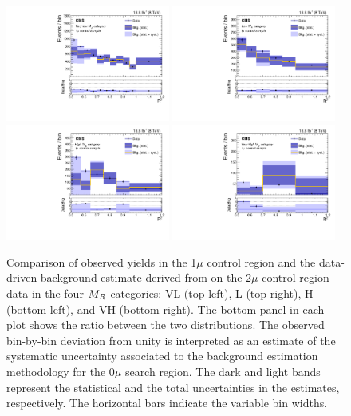 \begin{figure}
 \centering
   \includegraphics[width=0.48\textwidth]{PredPlotsAN_1MU_LE/OneMu_sys_cat_1.pdf}
   \includegraphics[width=0.48\textwidth]{PredPlotsAN_1MU_LE/OneMu_sys_cat_2.pdf}
   \includegraphics[width=0.48\textwidth]{PredPlotsAN_1MU_LE/OneMu_sys_cat_3.pdf}
   \includegraphics[width=0.48\textwidth]{PredPlotsAN_1MU_LE/OneMu_sys_cat_4.pdf}
 \caption{Comparison of observed yields in the 1$\mu$ control region and the
   data-driven background estimate derived from on the 2$\mu$ control region data in the four $M_R$ categories:
   VL (top left), L (top right), H (bottom left), and VH (bottom right). The bottom panel in each plot shows the
   ratio between the two distributions. The observed bin-by-bin
   deviation from unity is interpreted as an estimate of the systematic uncertainty
   associated to the background estimation methodology for the 0$\mu$ search region. The
   dark and light bands represent the statistical and the total
   uncertainties in the estimates, respectively. The horizontal bars indicate
the variable bin widths.\label{fig:1muCLOSURE}}
\end{figure}


